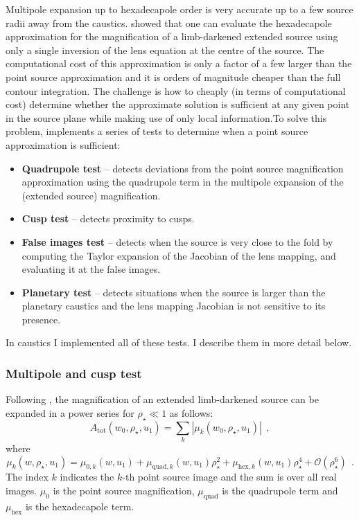 \documentclass[12pt,dvipsnames]{report}
\newcommand{\ssf}[1]{\textsf{#1}}
\newcommand{\hquad}{~~}
\begin{document}
Multipole expansion up to hexadecapole order \citep{2008ApJ...681.1593G,2017MNRAS.468.3993C}
is very accurate up to a few source radii away from the caustics. \citet{2017MNRAS.468.3993C} showed
that one can evaluate the hexadecapole approximation for the magnification of a limb-darkened 
extended source using only a single inversion of the lens equation at the centre of the 
source. The computational cost of this approximation is only a factor of a few larger than 
the point source approximation and it is orders of magnitude cheaper than the full contour
integration.
The challenge is how to cheaply (in terms of computational cost) determine whether the approximate 
solution is sufficient at any given point in the source plane while making use of only 
local information.To solve this problem, \citet{2018MNRAS.479.5157B} implements a 
series of tests to determine when a point source approximation is sufficient:
\begin{itemize}
    \item \textbf{Quadrupole test} -- detects deviations from the point source 
    magnification approximation using 
    the quadrupole term in the multipole expansion of the (extended source) magnification.
    \item \textbf{Cusp test} -- detects proximity to cusps.
    \item \textbf{False images test} -- detects when the source is very close to the fold by computing the 
    Taylor expansion of the Jacobian of the lens mapping, and evaluating it at the false images.
    \item \textbf{Planetary test} -- detects situations when the source is larger than 
    the planetary caustics and the lens mapping Jacobian is not sensitive to its presence.
\end{itemize}
In \ssf{caustics} I implemented all of these tests. I describe them in more detail below.

\subsubsection{Multipole and cusp test}
Following \citet{2017MNRAS.468.3993C}, the magnification of an extended limb-darkened source 
can be expanded in a power series for $\rho_\star\ll 1$ as follows:
\begin{equation}
    A_\mathrm{tot}(w_0,\rho_\star,u_1)=\sum_{k}|\mu_k(w_0,\rho_\star,u_1)|
    \hquad,
\end{equation}
where 
\begin{equation}
\mu_k(w,\rho_\star,u_1)=\mu_{0,k}(w,u_1) + \mu_{\mathrm{quad},k}(w,u_1)\rho_\star^2 + 
    \mu_{\mathrm{hex},k}(w,u_1)\rho_\star^4+\mathcal{O}(\rho_\star^6)
    \hquad.
\end{equation}
The index $k$ indicates the $k$-th point source image and the sum is over all real images.
$\mu_0$ is the point source magnification, $\mu_\mathrm{quad}$ is the quadrupole term 
and $\mu_\mathrm{hex}$ is the hexadecapole term. 
\end{document}
